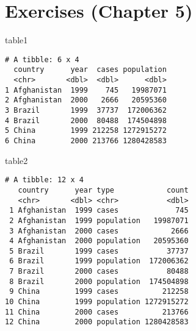 \documentclass[
  letterpaper,
  DIV=11,
  numbers=noendperiod]{scrreprt}
\newenvironment{Shaded}{\begin{snugshade}}{\end{snugshade}}
\newcommand{\NormalTok}[1]{\textcolor[rgb]{0.00,0.23,0.31}{#1}}
\begin{document}

\hypertarget{exercises-chapter-5}{%
\chapter{Exercises (Chapter 5)}\label{exercises-chapter-5}}

\begin{tcolorbox}[enhanced jigsaw, breakable, bottomtitle=1mm, left=2mm, colback=white, toprule=.15mm, leftrule=.75mm, colframe=quarto-callout-tip-color-frame, colbacktitle=quarto-callout-tip-color!10!white, title={Tables}, coltitle=black, toptitle=1mm, bottomrule=.15mm, opacitybacktitle=0.6, arc=.35mm, rightrule=.15mm, titlerule=0mm, opacityback=0]

\begin{Shaded}
\begin{Highlighting}[]
\NormalTok{table1}
\end{Highlighting}
\end{Shaded}

\begin{verbatim}
# A tibble: 6 x 4
  country      year  cases population
  <chr>       <dbl>  <dbl>      <dbl>
1 Afghanistan  1999    745   19987071
2 Afghanistan  2000   2666   20595360
3 Brazil       1999  37737  172006362
4 Brazil       2000  80488  174504898
5 China        1999 212258 1272915272
6 China        2000 213766 1280428583
\end{verbatim}

\begin{Shaded}
\begin{Highlighting}[]
\NormalTok{table2}
\end{Highlighting}
\end{Shaded}

\begin{verbatim}
# A tibble: 12 x 4
   country      year type            count
   <chr>       <dbl> <chr>           <dbl>
 1 Afghanistan  1999 cases             745
 2 Afghanistan  1999 population   19987071
 3 Afghanistan  2000 cases            2666
 4 Afghanistan  2000 population   20595360
 5 Brazil       1999 cases           37737
 6 Brazil       1999 population  172006362
 7 Brazil       2000 cases           80488
 8 Brazil       2000 population  174504898
 9 China        1999 cases          212258
10 China        1999 population 1272915272
11 China        2000 cases          213766
12 China        2000 population 1280428583
\end{verbatim}


\end{tcolorbox}
\end{document}
